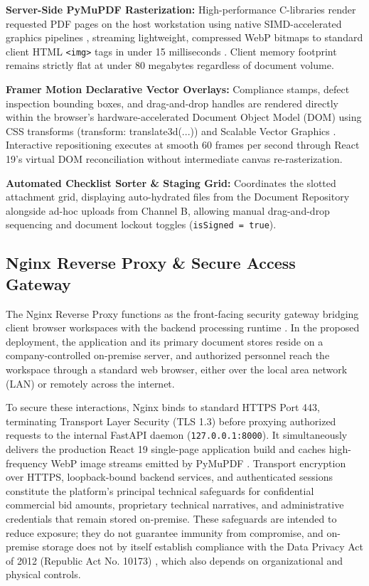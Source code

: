 \textbf{Server-Side PyMuPDF Rasterization:} High-performance C-libraries render requested PDF pages on the host workstation using native SIMD-accelerated graphics pipelines \cite{ref40}, streaming lightweight, compressed WebP bitmaps to standard client HTML \texttt{<img>} tags in under 15 milliseconds \cite{ref39}. Client memory footprint remains strictly flat at under 80 megabytes regardless of document volume.

\textbf{Framer Motion Declarative Vector Overlays:} Compliance stamps, defect inspection bounding boxes, and drag-and-drop handles are rendered directly within the browser's hardware-accelerated Document Object Model (DOM) using CSS transforms (transform: translate3d(...)) and Scalable Vector Graphics \cite{ref37, ref38}.
Interactive repositioning executes at smooth 60 frames per second through React 19's virtual DOM reconciliation \cite{ref36} without intermediate canvas re-rasterization.

\textbf{Automated Checklist Sorter \& Staging Grid:} Coordinates the slotted attachment grid, displaying auto-hydrated files from the Document Repository alongside ad-hoc uploads from Channel B, allowing manual drag-and-drop sequencing and document lockout toggles (\texttt{isSigned = true}).

\subsection{Nginx Reverse Proxy \& Secure Access Gateway}
The Nginx Reverse Proxy functions as the front-facing security gateway bridging client browser workspaces with the backend processing runtime \cite{ref58}.
In the proposed deployment, the application and its primary document stores reside on a company-controlled on-premise server, and authorized personnel reach the workspace through a standard web browser, either over the local area network (LAN) or remotely across the internet.

To secure these interactions, Nginx binds to standard HTTPS Port 443, terminating Transport Layer Security (TLS 1.3) before proxying authorized requests to the internal FastAPI daemon (\texttt{127.0.0.1:8000}).
It simultaneously delivers the production React 19 single-page application build and caches high-frequency WebP image streams emitted by PyMuPDF \cite{ref39, ref40}.
Transport encryption over HTTPS, loopback-bound backend services, and authenticated sessions constitute the platform's principal technical safeguards for confidential commercial bid amounts, proprietary technical narratives, and administrative credentials that remain stored on-premise. These safeguards are intended to reduce exposure; they do not guarantee immunity from compromise, and on-premise storage does not by itself establish compliance with the Data Privacy Act of 2012 (Republic Act No. 10173) \cite{ref6}, which also depends on organizational and physical controls.

